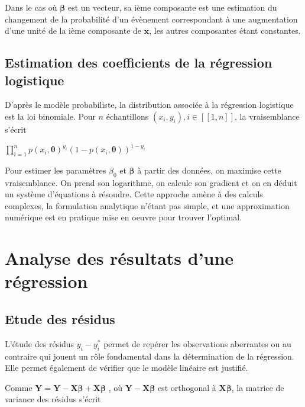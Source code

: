 \documentclass[letterpaper,10pt,french]{sphinxmanual}
\begin{document}
\sphinxAtStartPar
Dans le cas où \(\boldsymbol\beta\) est un vecteur, sa ième composante est une estimation du changement de la probabilité d’un évènement correspondant à une augmentation d’une unité de la ième composante de \(\mathbf x\), les autres composantes étant constantes.


\subsection{Estimation des coefficients de la régression logistique}
\label{\detokenize{regression:estimation-des-coefficients-de-la-regression-logistique}}
\sphinxAtStartPar
D’après le modèle probabiliste, la distribution associée à la régression logistique est la loi binomiale. Pour \(n\) échantillons \((x_i,y_i),i\in[\![1,n]\!]\), la vraisemblance s’écrit

\sphinxAtStartPar
\(\displaystyle\prod_{i=1}^n p(x_i,\boldsymbol\theta)^{y_i}(1-p(x_i,\boldsymbol\theta))^{1-y_i}\)

\sphinxAtStartPar
Pour estimer les paramètres \(\beta_0\) et \(\boldsymbol\beta\) à partir des données, on maximise cette vraisemblance. On prend son logarithme, on calcule son gradient et on en déduit un système d’équations à résoudre. Cette approche amène à des calculs complexes, la formulation analytique n’étant pas simple, et une approximation numérique est en pratique mise en oeuvre pour trouver l’optimal.


\section{Analyse des résultats d’une régression}
\label{\detokenize{regression:analyse-des-resultats-d-une-regression}}

\subsection{Etude des résidus}
\label{\detokenize{regression:etude-des-residus}}
\sphinxAtStartPar
L’étude des résidus \( y_i- y^*_i\) permet de repérer les observations aberrantes ou au contraire qui jouent un rôle fondamental dans la détermination de la régression. Elle permet également de vérifier que  le modèle linéaire est justifié.

\sphinxAtStartPar
Comme \(\mathbf Y = \mathbf Y -\mathbf X\boldsymbol \beta +\mathbf X\boldsymbol \beta\) , où \(\mathbf Y-\mathbf X\boldsymbol \beta \) est orthogonal à \(\mathbf X\boldsymbol \beta\), la matrice de variance des résidus s’écrit
\end{document}
